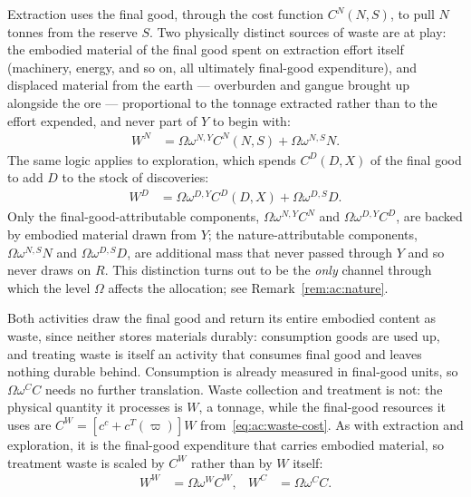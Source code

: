  Extraction uses the final good, through the cost function $C^N(N,S)$, to pull $N$ tonnes from the reserve $S$. Two physically distinct sources of waste are at play: the embodied material of the final good spent on extraction effort itself (machinery, energy, and so on, all ultimately final-good expenditure), and displaced material from the earth --- overburden and gangue brought up alongside the ore --- proportional to the tonnage extracted rather than to the effort expended, and never part of $Y$ to begin with:
\begin{align}
W^N &= \Omega\omega^{N,Y}C^N(N,S)+\Omega\omega^{N,S}N.
\label{eq:ac:extraction}
\end{align}
The same logic applies to exploration, which spends $C^D(D,X)$ of the final good to add $D$ to the stock of discoveries:
\begin{align}
W^D &= \Omega\omega^{D,Y}C^D(D,X)+\Omega\omega^{D,S}D.
\label{eq:ac:exploration}
\end{align}
Only the final-good-attributable components, $\Omega\omega^{N,Y}C^N$ and $\Omega\omega^{D,Y}C^D$, are backed by embodied material drawn from $Y$; the nature-attributable components, $\Omega\omega^{N,S}N$ and $\Omega\omega^{D,S}D$, are additional mass that never passed through $Y$ and so never draws on $R$. This distinction turns out to be the \emph{only} channel through which the level $\Omega$ affects the allocation; see Remark~\ref{rem:ac:nature}.

 Both activities draw the final good and return its entire embodied content as waste, since neither stores materials durably: consumption goods are used up, and treating waste is itself an activity that consumes final good and leaves nothing durable behind. Consumption is already measured in final-good units, so $\Omega\omega^CC$ needs no further translation. Waste collection and treatment is not: the physical quantity it processes is $W$, a tonnage, while the final-good resources it uses are $C^W=\left[c^c+c^T(\varpi)\right]W$ from~\eqref{eq:ac:waste-cost}. As with extraction and exploration, it is the final-good expenditure that carries embodied material, so treatment waste is scaled by $C^W$ rather than by $W$ itself:
\begin{align}
W^W &= \Omega\omega^WC^W, & W^C &= \Omega\omega^CC.
\label{eq:ac:wc}
\end{align}

